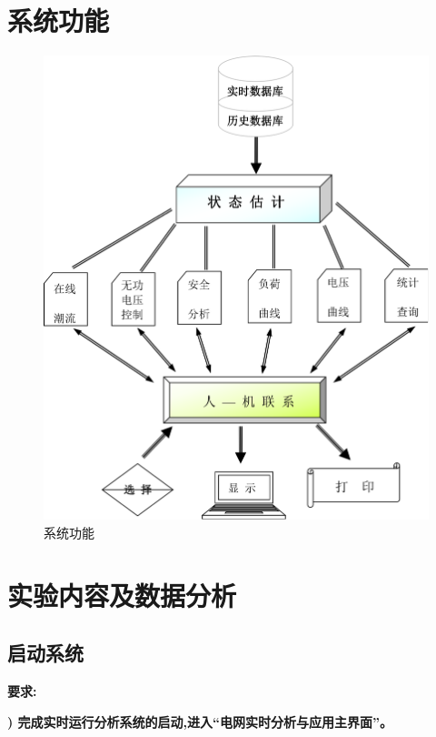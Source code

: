 \documentclass[a4paper]{ctexrep}
\begin{document}
            \newpage

            \section{系统功能}
                \begin{figure}[htbp]
                    \centering
                    \includegraphics[width=14cm]{2.pdf}
                    \caption{系统功能}
                \end{figure}

            \section{实验内容及数据分析}
                \subsection{启动系统}
                    \textbf{要求:}

                    \textbf{) 完成实时运行分析系统的启动,进入“电网实时分析与应用主界面”。}
\end{document}
